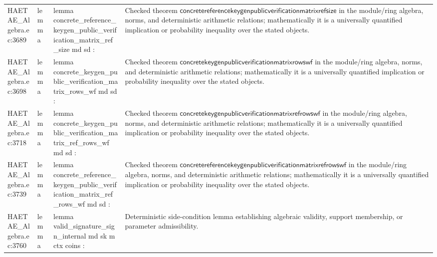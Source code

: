 \documentclass[10pt]{article}
\begin{document}
\begin{longtable}{L{0.11\textwidth}L{0.055\textwidth}L{0.385\textwidth}L{0.41\textwidth}}
HAETAE\_\allowbreak{}Algebra.\allowbreak{}ec:\allowbreak{}3689 & lemma & {\ttfamily\scriptsize lemma concrete\_\allowbreak{}reference\_\allowbreak{}keygen\_\allowbreak{}public\_\allowbreak{}verification\_\allowbreak{}matrix\_\allowbreak{}ref\_\allowbreak{}size md sd :} & Checked theorem $\mathsf{concretereferencekeygenpublicverificationmatrixrefsize}$ in the module/ring algebra, norms, and deterministic arithmetic relations; mathematically it is a universally quantified implication or probability inequality over the stated objects. \\
HAETAE\_\allowbreak{}Algebra.\allowbreak{}ec:\allowbreak{}3698 & lemma & {\ttfamily\scriptsize lemma concrete\_\allowbreak{}keygen\_\allowbreak{}public\_\allowbreak{}verification\_\allowbreak{}matrix\_\allowbreak{}rows\_\allowbreak{}wf md sd :} & Checked theorem $\mathsf{concretekeygenpublicverificationmatrixrowswf}$ in the module/ring algebra, norms, and deterministic arithmetic relations; mathematically it is a universally quantified implication or probability inequality over the stated objects. \\
HAETAE\_\allowbreak{}Algebra.\allowbreak{}ec:\allowbreak{}3718 & lemma & {\ttfamily\scriptsize lemma concrete\_\allowbreak{}keygen\_\allowbreak{}public\_\allowbreak{}verification\_\allowbreak{}matrix\_\allowbreak{}ref\_\allowbreak{}rows\_\allowbreak{}wf md sd :} & Checked theorem $\mathsf{concretekeygenpublicverificationmatrixrefrowswf}$ in the module/ring algebra, norms, and deterministic arithmetic relations; mathematically it is a universally quantified implication or probability inequality over the stated objects. \\
HAETAE\_\allowbreak{}Algebra.\allowbreak{}ec:\allowbreak{}3739 & lemma & {\ttfamily\scriptsize lemma concrete\_\allowbreak{}reference\_\allowbreak{}keygen\_\allowbreak{}public\_\allowbreak{}verification\_\allowbreak{}matrix\_\allowbreak{}ref\_\allowbreak{}rows\_\allowbreak{}wf md sd :} & Checked theorem $\mathsf{concretereferencekeygenpublicverificationmatrixrefrowswf}$ in the module/ring algebra, norms, and deterministic arithmetic relations; mathematically it is a universally quantified implication or probability inequality over the stated objects. \\
HAETAE\_\allowbreak{}Algebra.\allowbreak{}ec:\allowbreak{}3760 & lemma & {\ttfamily\scriptsize lemma valid\_\allowbreak{}signature\_\allowbreak{}sign\_\allowbreak{}internal md sk m ctx coins :} & Deterministic side-condition lemma establishing algebraic validity, support membership, or parameter admissibility. \\

\end{longtable}
\end{document}
